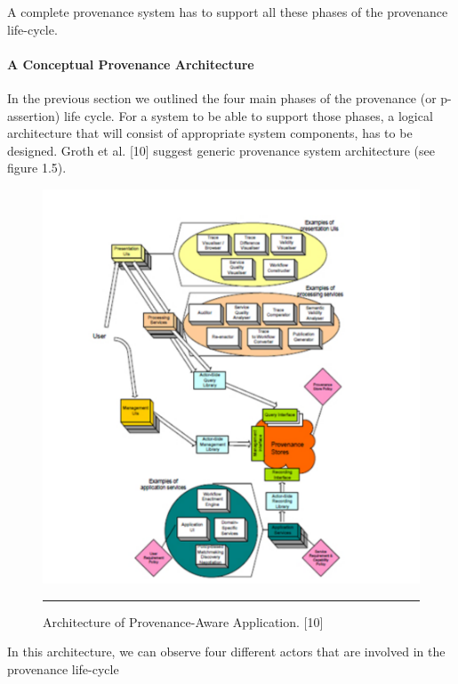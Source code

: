 A complete provenance system has to support all these phases of the provenance life-cycle.

\paragraph{A Conceptual Provenance Architecture}

In the previous section we outlined the four main phases of the provenance (or p-assertion) life cycle. For a system to be able to support those phases, a logical architecture that will consist of appropriate system components, has to be designed. Groth et al. [10] suggest generic provenance system architecture (see figure 1.5).

\begin{figure}[htbp]
	\centering
		\includegraphics{./Figures/figure5.pdf}
		\rule{35em}{0.5pt}
	\caption[Architecture of Provenance-Aware Application]{Architecture of Provenance-Aware Application. [10]}
	\label{fig:provArch}
\end{figure}

In this architecture, we can observe four different actors that are involved in the provenance life-cycle

